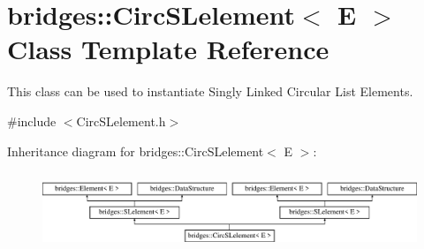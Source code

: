 \hypertarget{classbridges_1_1_circ_s_lelement}{}\section{bridges\+:\+:Circ\+S\+Lelement$<$ E $>$ Class Template Reference}
\label{classbridges_1_1_circ_s_lelement}


This class can be used to instantiate Singly Linked Circular List Elements.  




{\ttfamily \#include $<$Circ\+S\+Lelement.\+h$>$}

Inheritance diagram for bridges\+:\+:Circ\+S\+Lelement$<$ E $>$\+:\begin{figure}[H]
\begin{center}
\leavevmode
\includegraphics[height=2.307692cm]{classbridges_1_1_circ_s_lelement}
\end{center}
\end{figure}
